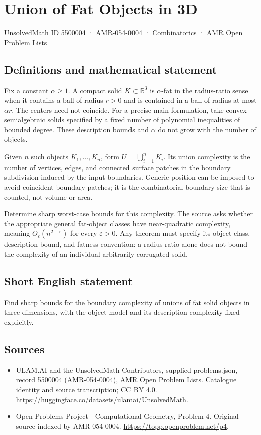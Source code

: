\documentclass[11pt,a4paper]{article}
\begin{document}
\section*{Union of Fat Objects in 3D}\label{5500004}
{\small UnsolvedMath ID 5500004 · AMR-054-0004 · Combinatorics · AMR Open Problem Lists}
\subsection{Definitions and mathematical statement}
Fix a constant $\alpha\ge1$. A compact solid $K\subset\mathbb R^3$ is
$\alpha$-fat in the radius-ratio sense when it contains a ball of radius
$r>0$ and is contained in a ball of radius at most $\alpha r$. The centers
need not coincide. For a precise main formulation, take convex
semialgebraic solids specified by a fixed number of polynomial
inequalities of bounded degree. These description bounds and $\alpha$
do not grow with the number of objects.

Given $n$ such objects $K_1,\ldots,K_n$, form
$U=\bigcup_{i=1}^nK_i$. Its union complexity is the number of vertices,
edges, and connected surface patches in the boundary subdivision induced
by the input boundaries. Generic position can be imposed to avoid
coincident boundary patches; it is the combinatorial boundary size that
is counted, not volume or area.

Determine sharp worst-case bounds for this complexity. The source asks
whether the appropriate general fat-object classes have near-quadratic
complexity, meaning $O_\varepsilon(n^{2+\varepsilon})$ for every
$\varepsilon>0$. Any theorem must specify its object class, description
bound, and fatness convention: a radius ratio alone does not bound the
complexity of an individual arbitrarily corrugated solid.
\subsection{Short English statement}
Find sharp bounds for the boundary complexity of unions of fat solid
objects in three dimensions, with the object model and its description
complexity fixed explicitly.
\subsection{Sources}
\begin{itemize}
\item[S1] ULAM.AI and the UnsolvedMath Contributors, supplied problems.json, record 5500004 (AMR-054-0004), AMR Open Problem Lists. Catalogue identity and source transcription; CC BY 4.0.
\url{https://huggingface.co/datasets/ulamai/UnsolvedMath}.
\item[S2] Open Problems Project - Computational Geometry, Problem 4. Original source indexed by AMR-054-0004.
\url{https://topp.openproblem.net/p4}.
\end{itemize}
\end{document}
